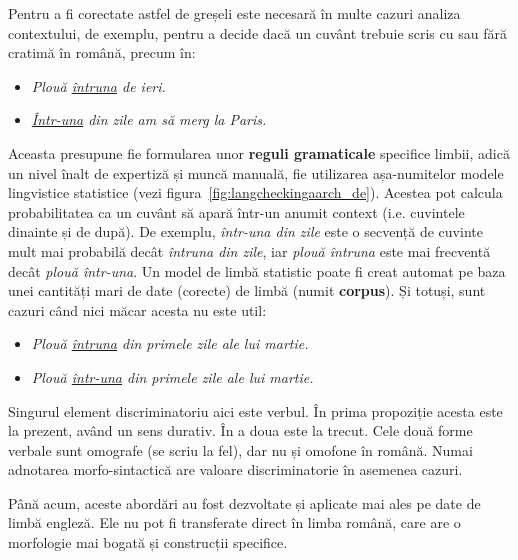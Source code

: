 \documentclass[]{../../metanetpaper}
\begin{document}
\begin{multicols}{2}
Pentru a fi corectate astfel de greșeli este necesară în multe cazuri analiza contextului, de exemplu, pentru a decide dacă un cuvânt trebuie scris cu sau fără cratimă în română, precum în:

\begin{itemize}
\item \textit{Plouă \underline{întruna} de ieri.}
\item \textit{\underline{Într-una} din zile am să merg la Paris.}
\end{itemize}

Aceasta presupune fie formularea unor \textbf{reguli gramaticale} specifice limbii, adică un nivel înalt de expertiză și muncă manuală, fie utilizarea așa-numitelor modele lingvistice statistice (vezi figura~\ref{fig:langcheckingaarch_de}). Acestea pot calcula probabilitatea ca un cuvânt să apară într-un anumit context (i.e. cuvintele dinainte și de după). De exemplu, \textit{într-una din zile} este o secvență de cuvinte mult mai probabilă decât \textit{întruna din zile}, iar \textit{plouă întruna} este mai frecventă decât \textit{plouă într-una}. Un model de limbă statistic poate fi creat automat pe baza unei cantități mari de date (corecte) de limbă (numit \textbf{corpus}). Și totuși, sunt cazuri când nici măcar acesta nu este util:

\begin{itemize}
\item \textit{Plouă \underline{întruna} din primele zile ale lui martie.}
\item \textit{Plouă \underline{într-una} din primele zile ale lui martie.}
\end{itemize}

Singurul element discriminatoriu aici este verbul. În prima propoziție acesta este la prezent, având un sens durativ. În a doua este la trecut. Cele două forme verbale sunt omografe (se scriu la fel), dar nu și omofone în română. Numai adnotarea morfo-sintactică are valoare discriminatorie în asemenea cazuri.

Până acum, aceste abordări au fost dezvoltate și aplicate mai ales pe date de limbă engleză. Ele nu pot fi transferate direct în limba română, care are o morfologie mai bogată și construcții specifice.



\end{multicols}
\end{document}
